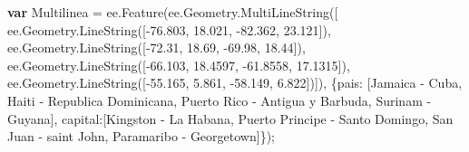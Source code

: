 \documentclass[
  12pt,
  letterpaper,
  twoside]{book}
\newenvironment{Shaded}{\begin{snugshade}}{\end{snugshade}}
\newcommand{\AttributeTok}[1]{\textcolor[rgb]{0.48,0.12,0.64}{#1}}
\newcommand{\DataTypeTok}[1]{\textcolor[rgb]{0.00,0.00,0.00}{#1}}
\newcommand{\FloatTok}[1]{\textcolor[rgb]{0.28,0.53,0.93}{#1}}
\newcommand{\FunctionTok}[1]{\textcolor[rgb]{0.48,0.12,0.64}{#1}}
\newcommand{\KeywordTok}[1]{\textcolor[rgb]{0.00,0.00,0.00}{\textbf{#1}}}
\newcommand{\NormalTok}[1]{#1}
\newcommand{\OperatorTok}[1]{\textcolor[rgb]{0.00,0.00,0.00}{#1}}
\newcommand{\StringTok}[1]{\textcolor[rgb]{0.87,0.29,0.22}{#1}}
\begin{document}
\begin{Shaded}
\begin{Highlighting}[]
\KeywordTok{var}\NormalTok{ Multilinea }\OperatorTok{=}\NormalTok{ ee}\OperatorTok{.}\FunctionTok{Feature}\NormalTok{(ee}\OperatorTok{.}\AttributeTok{Geometry}\OperatorTok{.}\FunctionTok{MultiLineString}\NormalTok{([  }
\NormalTok{    ee}\OperatorTok{.}\AttributeTok{Geometry}\OperatorTok{.}\FunctionTok{LineString}\NormalTok{([}\OperatorTok{{-}}\FloatTok{76.803}\OperatorTok{,} \FloatTok{18.021}\OperatorTok{,} \OperatorTok{{-}}\FloatTok{82.362}\OperatorTok{,} \FloatTok{23.121}\NormalTok{])}\OperatorTok{,}      
\NormalTok{    ee}\OperatorTok{.}\AttributeTok{Geometry}\OperatorTok{.}\FunctionTok{LineString}\NormalTok{([}\OperatorTok{{-}}\FloatTok{72.31}\OperatorTok{,} \FloatTok{18.69}\OperatorTok{,} \OperatorTok{{-}}\FloatTok{69.98}\OperatorTok{,} \FloatTok{18.44}\NormalTok{])}\OperatorTok{,}        
\NormalTok{    ee}\OperatorTok{.}\AttributeTok{Geometry}\OperatorTok{.}\FunctionTok{LineString}\NormalTok{([}\OperatorTok{{-}}\FloatTok{66.103}\OperatorTok{,} \FloatTok{18.4597}\OperatorTok{,} \OperatorTok{{-}}\FloatTok{61.8558}\OperatorTok{,} \FloatTok{17.1315}\NormalTok{])}\OperatorTok{,}
\NormalTok{    ee}\OperatorTok{.}\AttributeTok{Geometry}\OperatorTok{.}\FunctionTok{LineString}\NormalTok{([}\OperatorTok{{-}}\FloatTok{55.165}\OperatorTok{,} \FloatTok{5.861}\OperatorTok{,} \OperatorTok{{-}}\FloatTok{58.149}\OperatorTok{,} \FloatTok{6.822}\NormalTok{])])}\OperatorTok{,}
\NormalTok{    \{}\DataTypeTok{pais}\OperatorTok{:}\NormalTok{  [}\StringTok{\textquotesingle{}Jamaica {-} Cuba\textquotesingle{}}\OperatorTok{,}
            \StringTok{\textquotesingle{}Haiti {-} Republica Dominicana\textquotesingle{}}\OperatorTok{,}
            \StringTok{\textquotesingle{}Puerto Rico {-} Antigua y Barbuda\textquotesingle{}}\OperatorTok{,}
            \StringTok{\textquotesingle{}Surinam {-} Guyana\textquotesingle{}}\NormalTok{]}\OperatorTok{,}
    \DataTypeTok{capital}\OperatorTok{:}\NormalTok{[}\StringTok{\textquotesingle{}Kingston {-} La Habana\textquotesingle{}}\OperatorTok{,}
            \StringTok{\textquotesingle{}Puerto Principe {-} Santo Domingo\textquotesingle{}}\OperatorTok{,}
            \StringTok{\textquotesingle{}San Juan {-} saint John\textquotesingle{}}\OperatorTok{,}
            \StringTok{\textquotesingle{}Paramaribo {-} Georgetown\textquotesingle{}}\NormalTok{]\})}\OperatorTok{;}


\end{Highlighting}
\end{Shaded}
\end{document}

